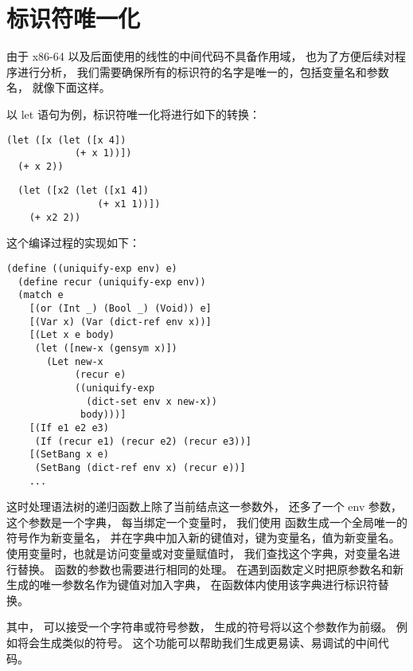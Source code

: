 
\section{标识符唯一化}

由于 x86-64 以及后面使用的线性的中间代码不具备作用域，
也为了方便后续对程序进行分析，
我们需要确保所有的标识符的名字是唯一的，包括变量名和参数名，
就像下面这样。

以 let 语句为例，标识符唯一化将进行如下的转换：
\begin{transformation}
\begin{lstlisting}
(let ([x (let ([x 4])
            (+ x 1))])
  (+ x 2))
\end{lstlisting}
\compilesto
\begin{lstlisting}
  (let ([x2 (let ([x1 4])
                (+ x1 1))])
    (+ x2 2))
\end{lstlisting}
\end{transformation}

这个编译过程的实现如下：

\begin{multilinecode}
\begin{lstlisting}
(define ((uniquify-exp env) e)
  (define recur (uniquify-exp env))
  (match e
    [(or (Int _) (Bool _) (Void)) e]
    [(Var x) (Var (dict-ref env x))]
    [(Let x e body)
     (let ([new-x (gensym x)])
       (Let new-x
            (recur e)
            ((uniquify-exp
              (dict-set env x new-x))
             body)))]
    [(If e1 e2 e3)
     (If (recur e1) (recur e2) (recur e3))]
    [(SetBang x e)
     (SetBang (dict-ref env x) (recur e))]
    ...
\end{lstlisting}
\end{multilinecode}


这时处理语法树的递归函数上除了当前结点这一参数外，
还多了一个 env 参数，这个参数是一个字典，
每当绑定一个变量时，
我们使用  函数生成一个全局唯一的符号作为新变量名，
并在字典中加入新的键值对，键为变量名，值为新变量名。
使用变量时，也就是访问变量或对变量赋值时，
我们查找这个字典，对变量名进行替换。
函数的参数也需要进行相同的处理。
在遇到函数定义时把原参数名和新生成的唯一参数名作为键值对加入字典，
在函数体内使用该字典进行标识符替换。

其中， 可以接受一个字符串或符号参数，
生成的符号将以这个参数作为前缀。
例如将会生成类似的符号。
这个功能可以帮助我们生成更易读、易调试的中间代码。
